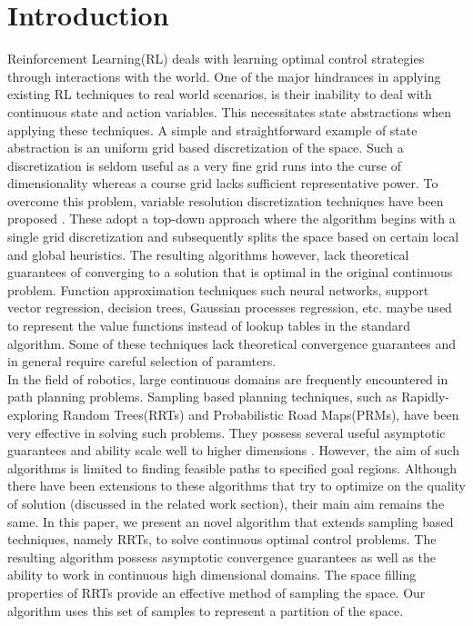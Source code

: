 \documentclass[wcp]{jmlr}
\begin{document}
\section{Introduction}
Reinforcement Learning(RL) deals with learning optimal control strategies through interactions with the world. One of the major hindrances in applying existing RL techniques to real world scenarios, is their inability to deal with continuous state and action variables. This necessitates state abstractions when applying these techniques. A  simple and straightforward example of state abstraction is an uniform grid based discretization of the space. Such a discretization is seldom useful as a very fine grid runs into the curse of dimensionality whereas a course grid lacks sufficient representative power. To overcome this problem, variable resolution discretization techniques have been proposed \citep{munosvariablehigh,partigame}. These adopt a top-down approach where the algorithm begins with a single grid discretization and subsequently splits the space based on certain local and global heuristics. The resulting algorithms however, lack theoretical guarantees of converging to a solution that is optimal in the original continuous problem. Function approximation techniques such neural networks, support vector regression, decision trees, Gaussian processes regression, etc. maybe used to represent the value functions instead of lookup tables in the standard algorithm. Some of these techniques lack theoretical convergence guarantees and in general require careful selection of paramters.\\
In the field of robotics, large continuous domains are frequently encountered in path planning problems. Sampling based planning techniques, such as Rapidly-exploring Random Trees(RRTs) and Probabilistic Road Maps(PRMs), have been very effective in solving such problems. They possess several useful asymptotic guarantees and ability scale well to higher dimensions \citep{rrt}. However, the aim of such algorithms is limited to finding feasible paths to specified goal regions. Although there have been extensions to these algorithms that try to optimize on the quality of solution (discussed in the related work section), their main aim remains the same. In this paper, we present an novel algorithm that extends sampling based techniques, namely RRTs, to solve continuous optimal control problems. The resulting algorithm possess asymptotic convergence guarantees as well as the ability to work in continuous high dimensional domains. The space filling properties of RRTs provide an effective method of sampling the space. Our algorithm uses this set of samples to represent a partition of the space.
\end{document}
